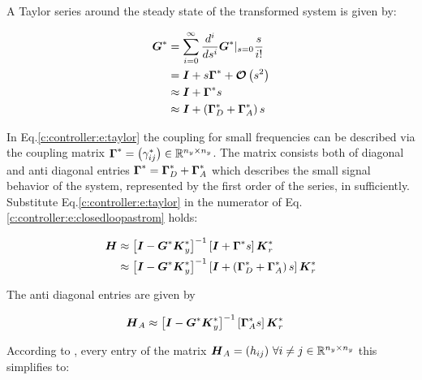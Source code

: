 A Taylor series around the steady state of the  transformed system is given by:

\begin{align}
\begin{split}
\mbox{\boldmath$G$}^* &= \sum_{i=0}^\infty \frac{d^i}{ds^i} \mbox{\boldmath$G$}^* |_{s=0} \frac{s}{i!} \\
&= \mbox{\boldmath$I$} + s \mbox{\boldmath$\Gamma$}^* + \mbox{\boldmath$\mathcal{O}$}\left(s^2\right) \\
&\approx \mbox{\boldmath$I$} +  \mbox{\boldmath$\Gamma$}^* s \\
&\approx \mbox{\boldmath$I$} + \left( \mbox{\boldmath$\Gamma$}^*_D + \mbox{\boldmath$\Gamma$}^*_A \right) s
\end{split}
\label{c:controller:e:taylor}
\end{align}

In Eq.\ref{c:controller:e:taylor} the coupling for small frequencies can be described via the coupling matrix $\mbox{\boldmath$\Gamma$}^* = \left( \gamma_{ij}^* \right)\in \mathbb{R}^{n_y \times n_y}$. The matrix consists both of diagonal and anti diagonal entries $\mbox{\boldmath$\Gamma$}^* = \mbox{\boldmath$\Gamma$}^*_D + \mbox{\boldmath$\Gamma$}^*_A$ which describes the small signal behavior of the system, represented by the first order of the series, in sufficiently.\\

Substitute Eq.\ref{c:controller:e:taylor} in the numerator of Eq. \ref{c:controller:e:closedloopastrom} holds:

\begin{align}
\begin{split}
\mbox{\boldmath$H$} &\approx \left[ \mbox{\boldmath$I$}  - \mbox{\boldmath$G$}^* \mbox{\boldmath$K$}_y^* \right]^{-1} \left[ \mbox{\boldmath$I$} +  \mbox{\boldmath$\Gamma$}^* s \right] \mbox{\boldmath$K$}_r^* \\
  &\approx \left[ \mbox{\boldmath$I$}  - \mbox{\boldmath$G$}^* \mbox{\boldmath$K$}_y^* \right]^{-1} \left[ \mbox{\boldmath$I$} + \left( \mbox{\boldmath$\Gamma$}^*_D + \mbox{\boldmath$\Gamma$}^*_A \right) s\right] \mbox{\boldmath$K$}_r^* \\
\end{split}
\end{align}

The anti diagonal entries are given by

\begin{align}
\begin{split}
\mbox{\boldmath$H$}_A &\approx \left[ \mbox{\boldmath$I$}  - \mbox{\boldmath$G$}^* \mbox{\boldmath$K$}_y^* \right]^{-1} \left[\mbox{\boldmath$\Gamma$}_A^* s \right] \mbox{\boldmath$K$}_r^*
\end{split}
\end{align}

According to \cite{Astrom2001a}, every entry of the matrix $\mbox{\boldmath$H$}_A = (h_{ij})~\forall i \neq j \in \mathbb{R}^{n_y \times n_y} $ this simplifies to:

